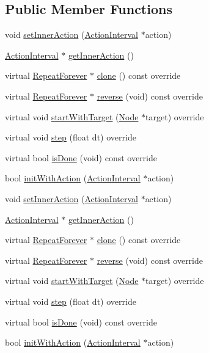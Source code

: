 \subsection*{Public Member Functions}
\begin{DoxyCompactItemize}
\item 
void \hyperlink{classRepeatForever_a7f8ea33f8ff4be43698d4bfdeab38c83}{set\+Inner\+Action} (\hyperlink{classActionInterval}{Action\+Interval} $\ast$action)
\item 
\hyperlink{classActionInterval}{Action\+Interval} $\ast$ \hyperlink{classRepeatForever_a778110910237e34b6197c9921c3fe1bb}{get\+Inner\+Action} ()
\item 
virtual \hyperlink{classRepeatForever}{Repeat\+Forever} $\ast$ \hyperlink{classRepeatForever_a6aff66deb28868b17fff43abebff2643}{clone} () const override
\item 
virtual \hyperlink{classRepeatForever}{Repeat\+Forever} $\ast$ \hyperlink{classRepeatForever_a83185ebb621d7dd7363b3b315170665e}{reverse} (void) const override
\item 
virtual void \hyperlink{classRepeatForever_acdaeb5aec3a6cd6c0f3347c80634d02d}{start\+With\+Target} (\hyperlink{classNode}{Node} $\ast$target) override
\item 
virtual void \hyperlink{classRepeatForever_ab54150411685995a17a2b68d561e8d9c}{step} (float dt) override
\item 
virtual bool \hyperlink{classRepeatForever_a373f8961c015a1afa61c293ce787382c}{is\+Done} (void) const override
\item 
bool \hyperlink{classRepeatForever_a43be589f168fffe1fb2868ab92c44c5d}{init\+With\+Action} (\hyperlink{classActionInterval}{Action\+Interval} $\ast$action)
\item 
void \hyperlink{classRepeatForever_a7f8ea33f8ff4be43698d4bfdeab38c83}{set\+Inner\+Action} (\hyperlink{classActionInterval}{Action\+Interval} $\ast$action)
\item 
\hyperlink{classActionInterval}{Action\+Interval} $\ast$ \hyperlink{classRepeatForever_a778110910237e34b6197c9921c3fe1bb}{get\+Inner\+Action} ()
\item 
virtual \hyperlink{classRepeatForever}{Repeat\+Forever} $\ast$ \hyperlink{classRepeatForever_a91c17cd4313202cb80baa6c115474493}{clone} () const override
\item 
virtual \hyperlink{classRepeatForever}{Repeat\+Forever} $\ast$ \hyperlink{classRepeatForever_a28dd8c54ad7f874f7f8f593b21969766}{reverse} (void) const override
\item 
virtual void \hyperlink{classRepeatForever_a83b514610d96b09673daa6aefcb2382a}{start\+With\+Target} (\hyperlink{classNode}{Node} $\ast$target) override
\item 
virtual void \hyperlink{classRepeatForever_a102815f01bc0afc0fbcb31840cdb699b}{step} (float dt) override
\item 
virtual bool \hyperlink{classRepeatForever_a5bae9a12b19d0c39d2a8a416bc68b1db}{is\+Done} (void) const override
\item 
bool \hyperlink{classRepeatForever_a43be589f168fffe1fb2868ab92c44c5d}{init\+With\+Action} (\hyperlink{classActionInterval}{Action\+Interval} $\ast$action)
\end{DoxyCompactItemize}
